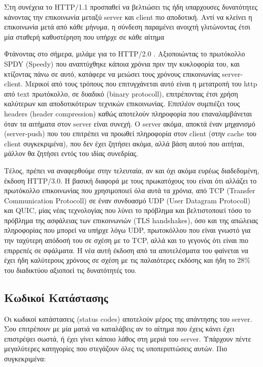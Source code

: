 Στη συνέχεια το HTTP/1.1 προσπαθεί να βελτιώσει τις ήδη υπαρχουσες δυνατότητες κάνοντας την επικοινωνία
μεταξύ server και client πιο αποδοτική. Αντί να κλείνει η επικοινωνία μετά από κάθε μήνυμα, η σύνδεση παραμένει
ανοιχτή γλιτώνοντας έτσι μία σταθερή καθυστέρηση που υπήρχε σε κάθε αίτημα

Φτάνοντας στο σήμερα, μιλάμε για το HTTP/2.0 \cite{http2}. Αξιοποιώντας το πρωτόκολλο SPDY (Speedy) που αναπτύχθηκε κάποια χρόνια πριν
την κυκλοφορία του, και κτίζοντας πάνω σε αυτό, κατάφερε να μειώσει τους χρόνους επικοινωνίας server-client.
Μερικοί από τους τρόπους που επιτυγχάνεται αυτό είναι η μετατροπή του http από text πρωτόκολλο, σε δυαδικό (binary protocoll), επιτρέποντας έτσι χρήση καλύτερων
και αποδοτικότερων τεχνικών επικοινωνίας. Επιπλέον συμπιέζει τους headers (header compression) καθώς αποτελούν πληροφορία που
επαναλαμβάνεται όταν τα αιτήματα στον server είναι συνεχή. Ο server ακόμα, αποκτά έναν μηχανισμό (server-push) που του
επιτρέπει να προωθεί πληροφορία στον client (στην cache του client συγκεκριμένα), που δεν έχει ζητήσει ακόμα, αλλά βάση αυτού
που αιτήται, μάλλον θα ζητήσει εντός του ιδίας συνεδρίας.

Τέλος, πρέπει να αναφερθούμε στην τελευταία, αν και όχι ακόμα ευρέως διαδεδομένη, έκδοση HTTP/3.0. H βασική διαφορά με τους
πρωκατόχους του είναι ότι αλλάζει το πρωτόκολλο επικοινωνίας που χρησιμοποιεί όλα αυτά τα χρόνια, από TCP (Transfer Communication Protocoll) σε
έναν συνδυασμό UDP (User Datagram Protocoll) και QUIC, μίας νέας τεχνολογίας που λύνει το πρόβλημα και βελτιστοποιεί τόσο το πρόβλημα 
της ασφάλειας των επικοινωνιών (TLS handshakes), όσο και της απώλειας πληροφορίας που μπορεί να υπήρχε λόγω UDP, πρωτοκόλλου που είναι γνωστό
για την ταχύτερη απόδοσή του σε σχέση με το TCP, αλλά και το γεγονός ότι είναι πιο επιρρεπές σε σφάλματα. Η νέα αυτή έκδοση από τα αποτελέσματα 
του \cite{http3} φαίνεται να έχει ήδη καλύτερους χρόνους σε σχέση με τις παλαιότερες εκδόσης και ήδη το 28\% του διαδικτύου αξιοποεί τις δυνατότητές του. 


\subsection{Κωδικοί Κατάστασης}
\label{subsec:http_status_codes}

Οι κωδικοί κατάστασεις (status codes) αποτελούν μέρος της απάντησης του server. Σου επιτρέπουν με μία ματιά να καταλάβεις
αν το αίτημα που έχεις κάνει έχει επιστρέψει σωστά, ή έχει γίνει κάποιο λάθος στη μεριά του server.
Υπάρχουν πέντε μεγαλύτερες κατηγορίες που στεγάζουν όλες τις υποπεριπτώσεις αυτών. Πιο συγκεκριμένα:

